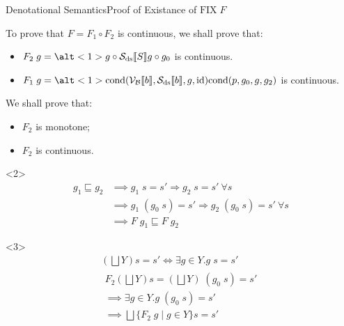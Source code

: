 \documentclass{beamer}
\newcommand{\sem}[2]{\mathcal{#1} \llbracket #2 \rrbracket}
\begin{document}
\begin{frame}{Denotational Semantics}{Proof of Existance of $\mathrm{FIX}\;F$}

    To prove that $F = F_1 \circ F_2$ is continuous, we shall prove that:
    \begin{itemize}
        \item<1,2-3> $F_2\;g = \alt<1>{g \circ \sem{S_\mathrm{ds}}{S}}{g \circ g_0}$ is continuous.
        \item<1,4> $F_1\;g = \alt<1>{\mathrm{cond}(\sem{V_B}{b}, \sem{S_\mathrm{ds}}{b}, g, \mathrm{id})}{\mathrm{cond}(p, g_0, g, g_2)}$ is continuous.
    \end{itemize}

    \begin{overprint}
        We shall prove that:
        \begin{itemize}
            \item<2> $F_2$ is monotone;
            \item<3> $F_2$ is continuous.
        \end{itemize}
        \begin{onlyenv}<2>
            \begin{align*}
                g_1 \sqsubseteq g_2
                 & \implies g_1\;s = s' \Rightarrow g_2\;s = s'\ \forall s               \\
                 & \implies g_1\;(g_0\;s) = s' \Rightarrow g_2\;(g_0\;s) = s'\ \forall s \\
                 & \implies F\;g_1 \sqsubseteq F\;g_2
            \end{align*}
        \end{onlyenv}
        \begin{onlyenv}<3>
            \begin{gather*}
                (\bigsqcup Y) s = s' \iff \exists g \in Y . g\;s = s' \\
                \begin{multlined}
                    F_2(\bigsqcup Y)s = (\bigsqcup Y)\;(g_0\;s) = s' \\
                    \implies \exists g \in Y . g\;(g_0\;s) = s'               \\
                    \implies \bigsqcup\{F_2\;g \mid g \in Y\}s = s'
                \end{multlined}
            \end{gather*}
        \end{onlyenv}


\end{overprint}
\end{frame}
\end{document}
